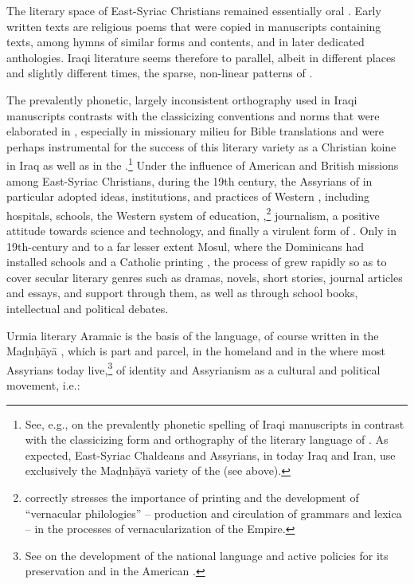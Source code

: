 \documentclass[output=paper,colorlinks,citecolor=brown,arabfont,syriacfont]{langscibook}
\begin{document}
The  literary space of East-Syriac Christians remained essentially oral \citep{mengozzi2012}. Early written texts are religious poems that were copied in manuscripts containing  texts, among hymns of similar forms and contents, and in later dedicated anthologies. Iraqi  literature seems therefore to parallel, albeit in different places and slightly different times, the sparse, non-linear patterns of   \citep[11]{murre-van_den_berg2020}.

The prevalently phonetic, largely inconsistent orthography used in Iraqi  manuscripts contrasts with the classicizing conventions and norms that were elaborated in , especially in missionary milieu for Bible translations \citep{murre-van_den_berg1999} and were perhaps instrumental for the success of this literary variety as a Christian koine in Iraq as well as in the .\footnote{%
See, e.g., \citet[18--20]{braida2014} on the prevalently phonetic spelling of Iraqi manuscripts in contrast with the classicizing form and orthography of the literary language of . As expected, East-Syriac Chaldeans and Assyrians, in today Iraq and Iran, use exclusively the Maḏnḥāyā variety of the   (see above).} Under the influence of American and British missions among East-Syriac Christians, during the 19th century, the Assyrians of  in particular adopted ideas, institutions, and practices of Western , including hospitals, schools, the Western system of education, ,\footnote{%
\citet[12--14]{leezenberg2021} correctly stresses the importance of printing and the development of ``vernacular philologies'' -- production and circulation of grammars and lexica -- in the processes of vernacularization of the  Empire.} journalism, a positive attitude towards science and technology, and finally a virulent form of   \citep{becker2015}. Only in 19th-century  and to a far lesser extent Mosul, where the  Dominicans had installed schools and a Catholic printing , the process of   grew rapidly so as to cover secular literary genres such as dramas, novels, short stories, journal articles and essays, and support through them, as well as through school books, intellectual and political debates.

Urmia literary Aramaic is the basis of the  language, of course written in the Maḏnḥāyā , which is part and parcel, in the homeland and in the  where most Assyrians today live,\footnote{%
See \citet{mengozzi2003} on the development of the  national language and active policies for its preservation and  in the American .} of  identity and Assyrianism as a cultural and political movement, i.e.:
\end{document}
